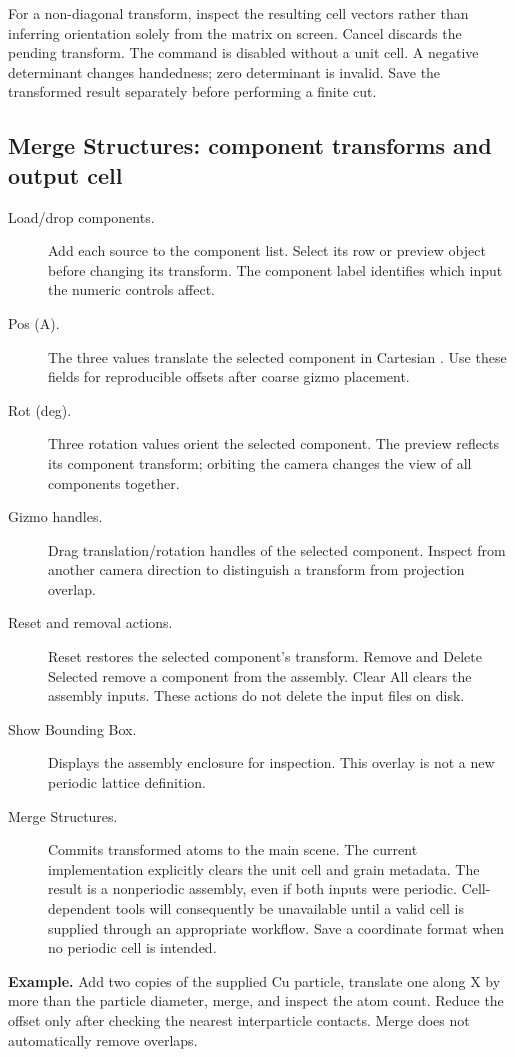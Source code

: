 For a non-diagonal transform, inspect the resulting cell vectors rather than inferring orientation solely from the matrix on screen. Cancel discards the pending transform. The command is disabled without a unit cell. A negative determinant changes handedness; zero determinant is invalid. Save the transformed result separately before performing a finite cut.

\subsection{Merge Structures: component transforms and output cell}
\begin{description}
\item[Load/drop components.] Add each source to the component list. Select its row or preview object before changing its transform. The component label identifies which input the numeric controls affect.
\item[Pos (A).] The three values translate the selected component in Cartesian \angstrom. Use these fields for reproducible offsets after coarse gizmo placement.
\item[Rot (deg).] Three rotation values orient the selected component. The preview reflects its component transform; orbiting the camera changes the view of all components together.
\item[Gizmo handles.] Drag translation/rotation handles of the selected component. Inspect from another camera direction to distinguish a transform from projection overlap.
\item[Reset and removal actions.] Reset restores the selected component's transform. Remove and Delete Selected remove a component from the assembly. Clear All clears the assembly inputs. These actions do not delete the input files on disk.
\item[Show Bounding Box.] Displays the assembly enclosure for inspection. This overlay is not a new periodic lattice definition.
\item[Merge Structures.] Commits transformed atoms to the main scene. The current implementation explicitly clears the unit cell and grain metadata. The result is a nonperiodic assembly, even if both inputs were periodic. Cell-dependent tools will consequently be unavailable until a valid cell is supplied through an appropriate workflow. Save a coordinate format when no periodic cell is intended.
\end{description}
\textbf{Example.} Add two copies of the supplied Cu particle, translate one along X by more than the particle diameter, merge, and inspect the atom count. Reduce the offset only after checking the nearest interparticle contacts. Merge does not automatically remove overlaps.

